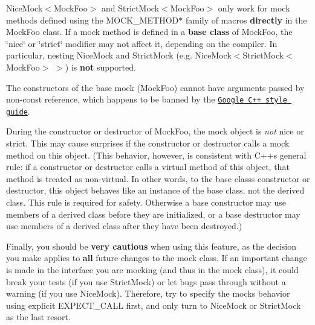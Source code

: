\begin{DoxyEnumerate}
\item {\ttfamily Nice\+Mock$<$Mock\+Foo$>$} and {\ttfamily Strict\+Mock$<$Mock\+Foo$>$} only work for mock methods defined using the {\ttfamily M\+O\+C\+K\+\_\+\+M\+E\+T\+H\+O\+D$\ast$} family of macros {\bfseries directly} in the {\ttfamily Mock\+Foo} class. If a mock method is defined in a {\bfseries base class} of {\ttfamily Mock\+Foo}, the \char`\"{}nice\char`\"{} or \char`\"{}strict\char`\"{} modifier may not affect it, depending on the compiler. In particular, nesting {\ttfamily Nice\+Mock} and {\ttfamily Strict\+Mock} (e.\+g. {\ttfamily Nice\+Mock$<$Strict\+Mock$<$Mock\+Foo$>$ $>$}) is {\bfseries not} supported.
\end{DoxyEnumerate}
\begin{DoxyEnumerate}
\item The constructors of the base mock ({\ttfamily Mock\+Foo}) cannot have arguments passed by non-\/const reference, which happens to be banned by the \href{http://google-styleguide.googlecode.com/svn/trunk/cppguide.xml}{\tt Google C++ style guide}.
\end{DoxyEnumerate}
\begin{DoxyEnumerate}
\item During the constructor or destructor of {\ttfamily Mock\+Foo}, the mock object is {\itshape not} nice or strict. This may cause surprises if the constructor or destructor calls a mock method on {\ttfamily this} object. (This behavior, however, is consistent with C++\textquotesingle{}s general rule\+: if a constructor or destructor calls a virtual method of {\ttfamily this} object, that method is treated as non-\/virtual. In other words, to the base class\textquotesingle{}s constructor or destructor, {\ttfamily this} object behaves like an instance of the base class, not the derived class. This rule is required for safety. Otherwise a base constructor may use members of a derived class before they are initialized, or a base destructor may use members of a derived class after they have been destroyed.)
\end{DoxyEnumerate}

Finally, you should be {\bfseries very cautious} when using this feature, as the decision you make applies to {\bfseries all} future changes to the mock class. If an important change is made in the interface you are mocking (and thus in the mock class), it could break your tests (if you use {\ttfamily Strict\+Mock}) or let bugs pass through without a warning (if you use {\ttfamily Nice\+Mock}). Therefore, try to specify the mock\textquotesingle{}s behavior using explicit {\ttfamily E\+X\+P\+E\+C\+T\+\_\+\+C\+A\+LL} first, and only turn to {\ttfamily Nice\+Mock} or {\ttfamily Strict\+Mock} as the last resort.

